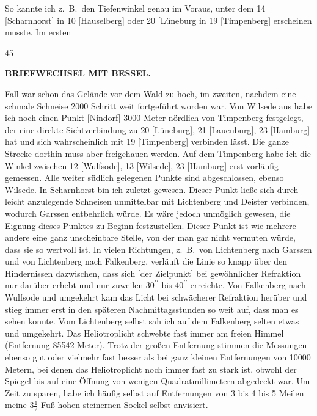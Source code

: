 So kannte ich z.~B.\ den Tiefenwinkel genau im Voraus, unter dem 14 [Scharnhorst] in 10 [Hauselberg] oder 20 [Lüneburg in 19 [Timpenberg] erscheinen musste. Im ersten
\par\smallskip{}\hfill{\footnotesize45}\par
\clearpage
{}\hfill{\small\textbf{BRIEFWECHSEL MIT BESSEL.}}\par\medskip
\noindent Fall war schon das Gelände vor dem Wald zu hoch, im zweiten, nachdem eine schmale Schneise 2000 Schritt weit fortgeführt worden war.
Von Wilsede aus habe ich noch einen Punkt [Nindorf] 3000 Meter nördlich von Timpenberg festgelegt, der eine direkte Sichtverbindung zu 20 [Lüneburg], 21 [Lauenburg], 23 [Hamburg] hat und sich wahrscheinlich mit 19 [Timpenberg] verbinden lässt. Die ganze Strecke dorthin muss aber freigehauen werden.
Auf dem Timpenberg habe ich die Winkel zwischen 12 [Wulfsode], 13 [Wilsede], 23 [Hamburg] erst vorläufig gemessen. Alle weiter südlich gelegenen Punkte sind abgeschlossen, ebenso Wilsede.
In Scharnhorst bin ich zuletzt gewesen. Dieser Punkt ließe sich durch leicht anzulegende Schneisen unmittelbar mit Lichtenberg und Deister verbinden, wodurch Garssen entbehrlich würde. Es wäre jedoch unmöglich gewesen, die Eignung dieses Punktes zu Beginn festzustellen.
Dieser Punkt ist wie mehrere andere eine ganz unscheinbare Stelle, von der man gar nicht vermuten würde, dass sie so wertvoll ist.
In vielen Richtungen, z.~B.\ von Lichtenberg nach Garssen und von Lichtenberg nach Falkenberg, verläuft die Linie so knapp über den Hindernissen dazwischen, dass sich [der Zielpunkt] bei gewöhnlicher Refraktion nur  darüber erhebt und nur zuweilen \(30^{\prime\prime}\) bis \(40^{\prime\prime}\) erreichte. Von Falkenberg nach Wulfsode und umgekehrt kam das Licht bei schwächerer Refraktion  herüber und stieg immer erst in den späteren Nachmittagsstunden so weit auf, dass man es sehen konnte.
Vom Lichtenberg selbst sah ich auf dem Falkenberg selten etwas und umgekehrt. Das Heliotroplicht schwebte fast immer am freien Himmel (Entfernung 85542 Meter). Trotz der großen Entfernung stimmen die Messungen ebenso gut oder vielmehr fast besser als bei ganz kleinen Entfernungen von 10000 Metern, bei denen das Heliotroplicht noch immer fast zu stark ist, obwohl der Spiegel bis auf eine Öffnung von wenigen Quadratmillimetern abgedeckt war.
Um Zeit zu sparen, habe ich häufig selbst auf Entfernungen von 3 bis 4 bis 5 Meilen meine \(3\frac{1}{2}\) Fuß hohen steinernen Sockel selbst anvisiert.
